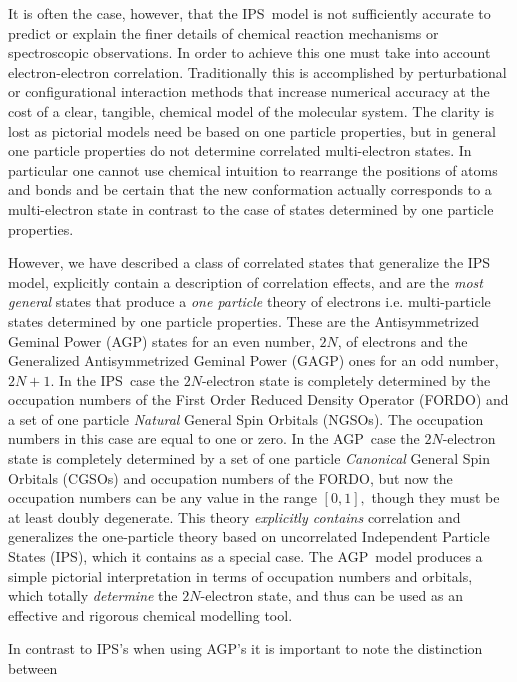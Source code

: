 \documentclass[aps,preprint]{revtex4}%
\begin{document}
It is often the case, however, that the IPS\ model is not sufficiently
accurate to predict or explain the finer details of chemical reaction
mechanisms or spectroscopic observations. In order to achieve this one must
take into account electron-electron correlation. Traditionally this is
accomplished by perturbational or configurational interaction methods that
increase numerical accuracy at the cost of a clear, tangible, chemical model
of the molecular system. The clarity is lost as pictorial models need be based
on one particle properties, but in general one particle properties do not
determine correlated multi-electron states. In particular one cannot use
chemical intuition to rearrange the positions of atoms and bonds and be
certain that the new conformation actually corresponds to a multi-electron
state in contrast to the case of states determined by one particle properties.

However, we have described \cite{Weiner & Ortiz 2003} a class of correlated
states that generalize the IPS model, explicitly contain a description of
correlation effects, and are the \emph{most general} states that produce a
\emph{one particle} theory of electrons i.e. multi-particle states determined
by one particle properties. These are the Antisymmetrized Geminal Power (AGP)
states for an even number, $2N$, of electrons and the Generalized
Antisymmetrized Geminal Power (GAGP) ones for an odd number, $2N+1$. In the
IPS\ case the $2N$-electron state is completely determined by the occupation
numbers of the First Order Reduced Density Operator (FORDO) and a set of one
particle \emph{Natural }General Spin Orbitals (NGSOs). The occupation numbers
in this case are equal to one or zero. In the AGP\ case the $2N$-electron
state is completely determined by a set of one particle \emph{Canonical
}General Spin Orbitals (CGSOs) and occupation numbers of the FORDO, but now
the occupation numbers can be any value in the range $\left[  0,1\right]  ,$
though they must be at least doubly degenerate. This theory \emph{explicitly
contains} correlation and generalizes the one-particle theory based on
uncorrelated Independent Particle States (IPS), which it contains as a special
case. The AGP\ model produces a simple pictorial interpretation in terms of
occupation numbers and orbitals, which totally \emph{determine} the
$2N$-electron state, and thus can be used as an effective and rigorous
chemical modelling tool.

In contrast to IPS's when using AGP's it is important to note the distinction between
\end{document}
